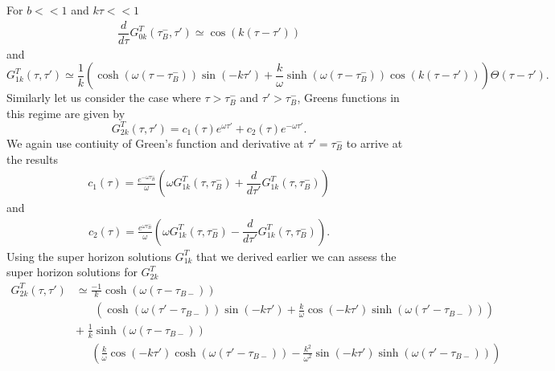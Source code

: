 \documentclass[12pt,a4paper]{article}
\numberwithin{equation}{section}
\numberwithin{equation}{section}
\begin{document}
For $b<<1$ and $k\tau<<1$
\begin{equation}
\begin{split}
    \dfrac{d}{d\tau}G^T_{0k}(\tau_B^-,\tau') \simeq \cos(k(\tau-\tau'))
    \end{split}
\end{equation}
and 
\begin{equation}
     G_{1k}^T(\tau,\tau') \simeq \frac{1}{k} \left( \cosh(\omega(\tau-\tau_B^-)) \sin(-k\tau')  +  \frac{k}{\omega} \sinh(\omega(\tau-\tau_B^-))   \cos(k(\tau-\tau')) \right) \Theta(\tau-\tau')  .
     \label{eq:greenfstbc}
\end{equation}
Similarly let us consider the case where $\tau>\tau_B^-$ and  $\tau'>\tau_B^-$, Greens functions in this regime are given by
\begin{equation}
    G^T_{2k}(\tau,\tau') = c_1(\tau) e^{\omega \tau'} + c_2(\tau) e^{-\omega \tau'}.
\end{equation}
We again use contiuity of Green's function and derivative at $\tau'=\tau_B^-$ to arrive at the results
\begin{equation}
    \begin{split}
        c_1(\tau) =  \frac{e^{-\omega \tau_B^-}}{\omega} \left( \omega  G^T_{1k}(\tau,\tau_B^-) + \dfrac{d}{d\tau'}  G^T_{1k}(\tau,\tau_B^-)   \right)
    \end{split}
\end{equation}
and 
\begin{equation}
    \begin{split}
        c_2(\tau) = \frac{e^{\omega \tau_B^-}}{\omega} \left( \omega G^T_{1k}(\tau,\tau_B^-) - \dfrac{d}{d\tau'}  G^T_{1k}(\tau,\tau_B^-)   \right).
    \end{split}
\end{equation}
Using the super horizon solutions $ G^T_{1k}$ that we derived earlier we can assess the super horizon solutions for $ G^T_{2k}$ 
\begin{equation}
\begin{split}
     G_{2k}^T(\tau,\tau') &\simeq \frac{-1}{k} \cosh(\omega(\tau-\tau_{B-})) \\
     &\;\;\;\;\;\;\left(\cosh(\omega(\tau'-\tau_{B-})) \sin(-k\tau') +\frac{k}{\omega} \cos(-k\tau') \sinh(\omega(\tau'-\tau_{B-})) \right) \\
     & +\;\frac{1}{k}\sinh(\omega(\tau-\tau_{B-}))\\
     &\;\;\;\;\;\left(\frac{k}{\omega}\cos(-k\tau') \cosh(\omega(\tau'-\tau_{B-})) - \frac{k^2}{\omega^2}\sin(-k\tau') \sinh(\omega(\tau'-\tau_{B-})) \right)
     \label{eq:greenfstbca}
\end{split}
\end{equation}
\end{document}

